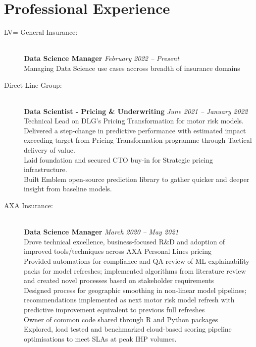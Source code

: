 \documentclass[11pt]{article}
\begin{document}
\section*{Professional Experience}
\begin{description}

\item[LV= General Insurance:] \hspace{1mm}\\
\textbf{Data Science Manager} \emph{February 2022 -- Present} \\
\textbullet \quad Managing Data Science use cases accross breadth of insurance domains\\


\item[Direct Line Group:] \hspace{1mm}\\
\textbf{Data Scientist - Pricing \& Underwriting} \emph{June 2021 -- January 2022} \\
\textbullet \quad Technical Lead on DLG's Pricing Transformation for motor risk models.\\
\textbullet \quad Delivered a step-change in predictive performance with 
estimated impact exceeding target from Pricing Transformation programme through Tactical delivery of value.\\
\textbullet \quad Laid foundation and secured CTO buy-in for Strategic pricing infrastructure.\\
\textbullet \quad Built Emblem open-source prediction library to gather quicker and deeper insight from baseline models.\\

\item[AXA Insurance:] \hspace{1mm} \\
\textbf{Data Science Manager} \emph{March 2020 -- May 2021}\\
\textbullet \quad Drove technical excellence, business-focused R\&D and adoption of improved tools/techniques across AXA Personal Lines pricing \\
\textbullet \quad Provided automations for compliance and QA review of ML explainability packs for model refreshes; implemented algorithms from literature review and created novel processes based on stakeholder requirements \\
\textbullet \quad Designed process for geographic smoothing in non-linear model pipelines; recommendations implemented as next motor risk model refresh with predictive improvement equivalent to previous full refreshes\\
\textbullet \quad Owner of common code shared through R and Python packages \\
\textbullet \quad Explored, load tested and benchmarked cloud-based scoring pipeline optimisations to meet SLAs at peak IHP volumes.\\


\end{description}
\end{document}

